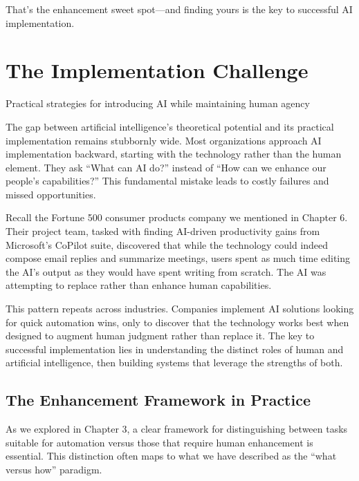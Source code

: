 \documentclass[
  Letterpaper,
]{scrbook}
\begin{document}
That's the enhancement sweet spot---and finding yours is the key to
successful AI implementation.


\chapter{The Implementation
Challenge}\label{the-implementation-challenge}

Practical strategies for introducing AI while maintaining human agency

\hfill\break

The gap between artificial intelligence's theoretical potential and its
practical implementation remains stubbornly wide. Most organizations
approach AI implementation backward, starting with the technology rather
than the human element. They ask ``What can AI do?'' instead of ``How
can we enhance our people's capabilities?'' This fundamental mistake
leads to costly failures and missed opportunities.

Recall the Fortune 500 consumer products company we mentioned in Chapter
6. Their project team, tasked with finding AI-driven productivity gains
from Microsoft's CoPilot suite, discovered that while the technology
could indeed compose email replies and summarize meetings, users spent
as much time editing the AI's output as they would have spent writing
from scratch. The AI was attempting to replace rather than enhance human
capabilities.

This pattern repeats across industries. Companies implement AI solutions
looking for quick automation wins, only to discover that the technology
works best when designed to augment human judgment rather than replace
it. The key to successful implementation lies in understanding the
distinct roles of human and artificial intelligence, then building
systems that leverage the strengths of both.

\section{The Enhancement Framework in
Practice}\label{the-enhancement-framework-in-practice}

As we explored in Chapter 3, a clear framework for distinguishing
between tasks suitable for automation versus those that require human
enhancement is essential. This distinction often maps to what we have
described as the ``what versus how'' paradigm.
\end{document}
